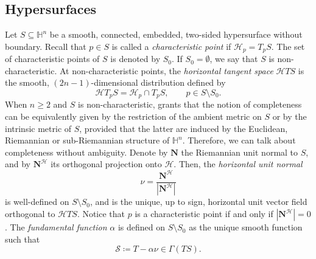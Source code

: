\documentclass[11pt]{amsart}
\renewcommand{\geq}{\geqslant}
\newcommand{\hhh}{{\mathcal{H}}}
\newcommand{\n}[1]{\nabla^\varepsilon_{ #1 }}
\newcommand{\vh}{\nu}
\newcommand{\hh}{{\mathbb{H}}}
\newcommand{\s}{\mathcal S}
\renewcommand{\n}{\mathbf{N}}
\theoremstyle{definition}
\theoremstyle{remark}
\numberwithin{equation}{section}
\begin{document}
\subsection{Hypersurfaces}\label{subsechypersurf}  Let $S\subseteq\hh^n$ be a smooth, connected, embedded, two-sided hypersurface without boundary. Recall that $p\in S$ is called a \emph{characteristic point} if $\hhh_p=T_p S$. The set of characteristic points of $S$ is denoted by $S_0$. If $S_0=\emptyset$, we say that $S$ is non-characteristic. At non-characteristic points, the \emph{horizontal tangent space} $\hhh TS$ is the smooth, $(2n-1)$-dimensional distribution defined by 
\begin{equation*}
    \hhh T_p S=\hhh_p\cap T_p S,\qquad p\in S\setminus S_0.
\end{equation*}
When $n\geq 2$ and $S$ is non-characteristic, \cite{MR4103357} grants that the notion of completeness can be equivalently given by the restriction of the ambient metric on $S$ or by the intrinsic metric of $S$, provided that the latter are induced by the Euclidean, Riemannian or sub-Riemannian structure of $\hh^n$. Therefore, we can talk about completeness without ambiguity.
Denote by $\n$ the Riemannian unit normal to $S$, and by $\n^\hhh$ its orthogonal projection onto $\hhh$. 
Then, the \emph{horizontal unit normal }  $$\vh=\frac{\n^\hhh}{|\n^\hhh|}$$ 
is well-defined on $S\setminus S_0$, and is the unique, up to sign, horizontal unit vector field orthogonal to $\hhh TS$. Notice that $p$ is a characteristic point if and only if $|\n^\hhh|=0$.
   The \emph{fundamental function} $\alpha$ is defined on $S\setminus S_0$ as the unique smooth function such that 
   \begin{equation*}\label{firstdefinitionofthevecotrs}
       \s\coloneqq T-\alpha\vh\in\Gamma(TS).
   \end{equation*}
\end{document}
